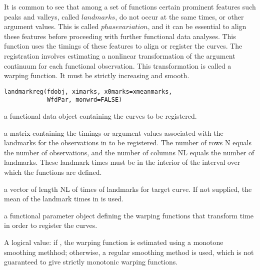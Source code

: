\documentclass{article}
\begin{document}
\begin{Description}\relax
It is common to see that among a set of functions certain prominent
features such peaks and valleys, called $landmarks$, do not occur
at the same times, or other
argument values.  This is called $phase variation$, and it can be
essential to align these features before proceeding with further
functional data analyses.  This function uses the timings of these
features to align or register the curves.  The registration involves
estimating a nonlinear transformation of the argument continuum for each
functional observation.  This transformation is called a warping
function. It must be strictly increasing and smooth.
\end{Description}
\begin{Usage}
\begin{verbatim}
landmarkreg(fdobj, ximarks, x0marks=xmeanmarks,
            WfdPar, monwrd=FALSE)
\end{verbatim}
\end{Usage}
\begin{Arguments}
\begin{ldescription}
\item[\code{fdobj}] a functional data object containing the curves to be registered.

\item[\code{ximarks}] a matrix containing the timings or argument values associated with
the landmarks for the observations in  to be registered.
The number of rows N equals the number of observations, and the
number of columns NL equals the number of landmarks. These landmark
times must be in the interior of the interval over which the
functions are defined.

\item[\code{x0marks}] a vector of length NL of times of landmarks for target curve.  If
not supplied, the mean of the landmark times in  is
used.

\item[\code{WfdPar}] a functional parameter object defining the warping functions that
transform time in order to register the curves.

\item[\code{monwrd}] A logical value:  if , the warping function is estimated
using a monotone smoothing methhod; otherwise, a regular smoothing
method is used, which is not guaranteed to give strictly monotonic
warping functions.

\end{ldescription}
\end{Arguments}
\end{document}
